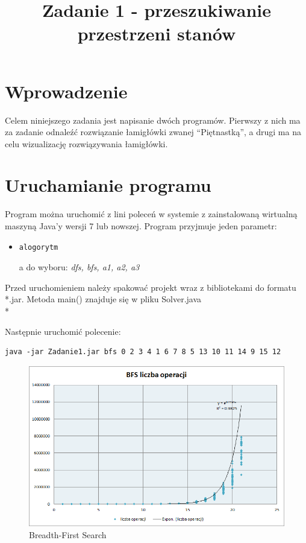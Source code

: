 \documentclass{classrep}
\author{
  \studentinfo{Łukasz Ochmański}{183566} \and
  \studentinfo{Przemysław Szwajkowski}{173524}
}
\title{Zadanie 1 - przeszukiwanie przestrzeni stanów}
\begin{document}
\maketitle


\section{Wprowadzenie}
Celem niniejszego zadania jest napisanie dwóch programów. Pierwszy z nich ma za zadanie odnaleźć rozwiązanie łamigłówki zwanej ``Piętnastką'', a drugi ma na celu wizualizację rozwiązywania łamigłówki.

\section{Uruchamianie programu}
Program można uruchomić z lini poleceń w systemie z zainstalowaną wirtualną maszyną Java'y wersji 7 lub nowszej. Program przyjmuje jeden parametr:

\begin{itemize}
  \item \begin{verbatim}alogorytm\end{verbatim} a do wyboru: \emph{dfs, bfs, a1, a2, a3}
\end{itemize}

Przed uruchomieniem należy spakować projekt wraz z bibliotekami do formatu *.jar.
Metoda main() znajduje się w pliku Solver.java
\\*

Następnie uruchomić polecenie:

\begin{verbatim}
java -jar Zadanie1.jar bfs 0 2 3 4 1 6 7 8 5 13 10 11 14 9 15 12
\end{verbatim}

\begin{figure}[ht]
\centering
			\includegraphics[scale=0.65]{pictures/BFS_operacje_exp.png}
	\caption{Breadth-First Search}
	\label{fig:Breadth-First Search}
\end{figure}
\end{document}
